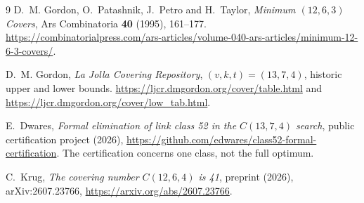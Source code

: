 \documentclass[11pt]{article}
\theoremstyle{definition}
\theoremstyle{remark}
\begin{document}
\begin{thebibliography}{9}
D.~M. Gordon, O.~Patashnik, J.~Petro and H.~Taylor,
\emph{Minimum $(12,6,3)$ Covers},
Ars Combinatoria \textbf{40} (1995), 161--177.
\url{https://combinatorialpress.com/ars-articles/volume-040-ars-articles/minimum-12-6-3-covers/}.

D.~M. Gordon, \emph{La Jolla Covering Repository},
$(v,k,t)=(13,7,4)$, historic upper and lower bounds.
\url{https://ljcr.dmgordon.org/cover/table.html} and
\url{https://ljcr.dmgordon.org/cover/low_tab.html}.

E.~Dwares, \emph{Formal elimination of link class 52 in the
$C(13,7,4)$ search}, public certification project (2026),
\url{https://github.com/edwares/class52-formal-certification}.
The certification concerns one class, not the full optimum.

C.~Krug, \emph{The covering number $C(12,6,4)$ is 41},
preprint (2026), arXiv:2607.23766,
\url{https://arxiv.org/abs/2607.23766}.
\end{thebibliography}
\end{document}
